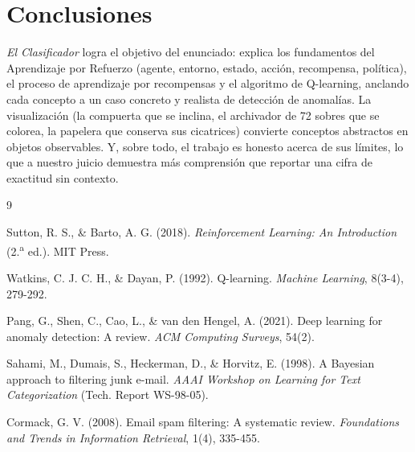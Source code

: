 \documentclass[11pt]{article}
\begin{document}
\section{Conclusiones}

\textit{El Clasificador} logra el objetivo del enunciado: explica los
fundamentos del Aprendizaje por Refuerzo (agente, entorno, estado, acción,
recompensa, política), el proceso de aprendizaje por recompensas y el
algoritmo de Q-learning, anclando cada concepto a un caso concreto y
realista de detección de anomalías. La visualización (la compuerta que se
inclina, el archivador de 72 sobres que se colorea, la papelera que
conserva sus cicatrices) convierte conceptos abstractos en objetos
observables. Y, sobre todo, el trabajo es honesto acerca de sus límites, lo
que a nuestro juicio demuestra más comprensión que reportar una cifra de
exactitud sin contexto.

\begin{thebibliography}{9}

Sutton, R. S., \& Barto, A. G. (2018). \textit{Reinforcement Learning: An
Introduction} (2.\textsuperscript{a} ed.). MIT Press.

Watkins, C. J. C. H., \& Dayan, P. (1992). Q-learning. \textit{Machine
Learning}, 8(3-4), 279-292.

Pang, G., Shen, C., Cao, L., \& van den Hengel, A. (2021). Deep learning for
anomaly detection: A review. \textit{ACM Computing Surveys}, 54(2).

Sahami, M., Dumais, S., Heckerman, D., \& Horvitz, E. (1998). A Bayesian
approach to filtering junk e-mail. \textit{AAAI Workshop on Learning for
Text Categorization} (Tech. Report WS-98-05).

Cormack, G. V. (2008). Email spam filtering: A systematic review.
\textit{Foundations and Trends in Information Retrieval}, 1(4), 335-455.

\end{thebibliography}
\end{document}
